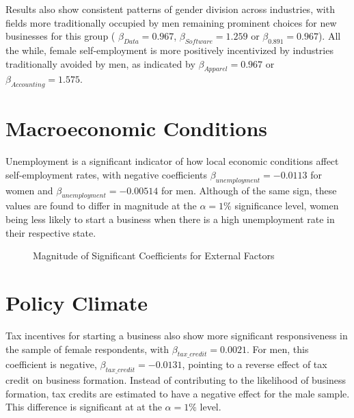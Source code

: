 Results also show consistent patterns of gender division across industries, with fields more traditionally occupied by men remaining prominent choices for new businesses for this group ( $\beta_{Data} = 0.967$, $\beta_{Software} = 1.259$ or $\beta_{0.891} = 0.967$). All the while, female self-employment is more positively incentivized by industries traditionally avoided by men, as indicated by $\beta_{Apparel} = 0.967$ or $\beta_{Accounting} = 1.575$.

\section{Macroeconomic Conditions}

Unemployment is a significant indicator of how local economic conditions affect self-employment rates, with negative coefficients $\beta_{unemployment} = -0.0113$ for women and $\beta_{unemployment} = -0.00514$ for men. Although of the same sign, these values are found to differ in magnitude at the $\alpha = 1\% $ significance level, women being less likely to start a business when there is a high unemployment rate in their respective state. 

\begin{figure}[hbtp]
    \caption{Magnitude of Significant Coefficients for External Factors} 
\end{figure}

\section{Policy Climate}
Tax incentives for starting a business also show more significant responsiveness in the sample of female respondents, with  $\beta_{tax\_credit} = 0.0021$. For men, this coefficient is negative, $\beta_{tax\_credit} = -0.0131$, pointing to a reverse effect of tax credit on business formation. Instead of contributing to the likelihood of business formation, tax credits are estimated to have a negative effect for the male sample. This difference is significant at at the $\alpha = 1\% $ level. 

